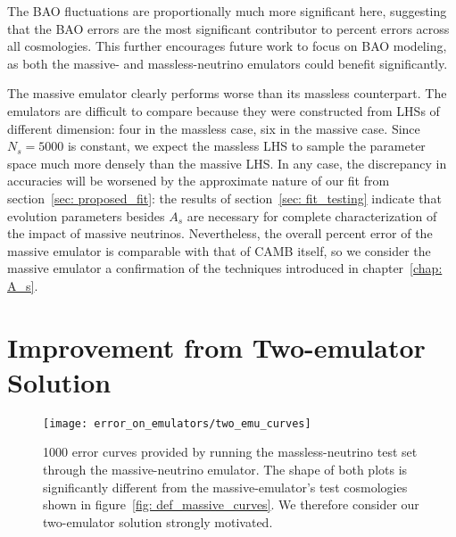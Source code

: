 The BAO fluctuations are proportionally much more significant here, suggesting
that the BAO errors are the most significant contributor to percent errors
across all cosmologies. This
further encourages future work to focus on BAO modeling, as both the massive-
and massless-neutrino emulators could benefit significantly.

The massive emulator clearly performs worse than its 
massless counterpart. The emulators are difficult to compare because they
were constructed from LHSs of different dimension: four in the massless case,
six in the massive case. Since $N_s = 5000$ is constant, we expect the 
massless LHS to sample the parameter space much more densely than the massive
LHS. In any case, the discrepancy in accuracies will be worsened by the
approximate nature of our fit from section~\ref{sec: proposed_fit}:
the results of section~\ref{sec: fit_testing} indicate
that evolution parameters besides $A_s$ are necessary for complete
characterization of the impact of massive neutrinos. Nevertheless, the
overall percent error of the massive emulator is comparable with that
of CAMB itself, so we consider the massive emulator a confirmation of the
techniques introduced in chapter~\ref{chap: A_s}.




\section{Improvement from Two-emulator Solution}
\label{sec: 2emu_improvement}

\begin{figure}[ht!]
  \centering
  \texttt{[image: error\_on\_emulators/two\_emu\_curves]}
  \caption[Performance of Massive Emulator in Massless Case]{1000 error
  	curves provided
  	by running the massless-neutrino test set through the massive-neutrino 
  	emulator. The shape of both plots is significantly different from the
  	massive-emulator's test cosmologies shown in
  	figure~\ref{fig: def_massive_curves}. We therefore consider our
  	two-emulator solution strongly motivated.}
  \label{fig: two_emu_curves}
\end{figure}

